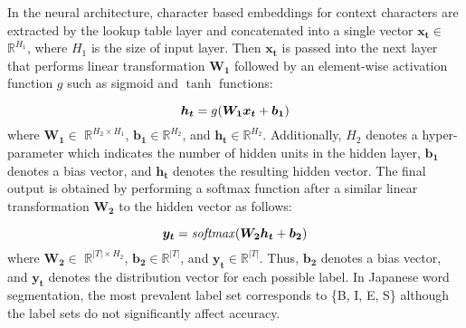 \documentclass[11pt,letterpaper]{article}
\begin{document}

In the neural architecture, character based embeddings for context characters are extracted by the lookup table layer and concatenated into a single vector $\bm{x_t}$$\in$ $\mathbb{R}^{H_{1}}$, where $H_{1}$ is the size of input layer. 
Then $\bm{x_{t}}$ is passed into the next layer that performs linear transformation $\bm{W_{1}}$  followed by an element-wise activation function $g$ such as sigmoid and $\tanh$ functions:


\begin{equation}
\label{ffnn_h}
 \bm{h_{t}} = g(\bm{W_{1}}\bm{x_{t}} + \bm{b_{1}})
 \vspace{6pt}
\end{equation}
where $\bm{W_1}$$\in$ $\mathbb{R}^{H_{2} \times H_{1}}$, $\bm{b_{1}}\in\mathbb{R}^{H_{2}}$, and $\bm{h_{t}}\in\mathbb{R}^{H_{2}}$. 
Additionally, $H_{2}$ denotes a hyper-parameter which indicates the number of hidden units in the hidden layer, $\bm{b_{1}}$ denotes a bias vector, and $\bm{h_{t}}$ denotes the resulting hidden vector. The final output is obtained by performing a softmax function after a similar linear transformation $\bm{W_2}$ to the hidden vector as follows:

\begin{equation}
 \bm{y_{t}} = \mathit{softmax}(\bm{W_{2}}\bm{h_{t}} + \bm{b_{2}})
 \vspace{6pt}
\end{equation}
where $\bm{W_2}$$\in$ $\mathbb{R}^{|T| \times H_{2}}$, $\bm{b_{2}}\in\mathbb{R}^{|T|}$, and $\bm{y_{t}}\in\mathbb{R}^{|T|}$. Thus, $\bm{b_{2}}$ denotes a bias vector, and $\bm{y_t}$  denotes the distribution vector for each possible label. In Japanese word segmentation, the most prevalent label set corresponds to \{B, I, E, S\} although the label sets do not significantly affect accuracy.
\end{document}
